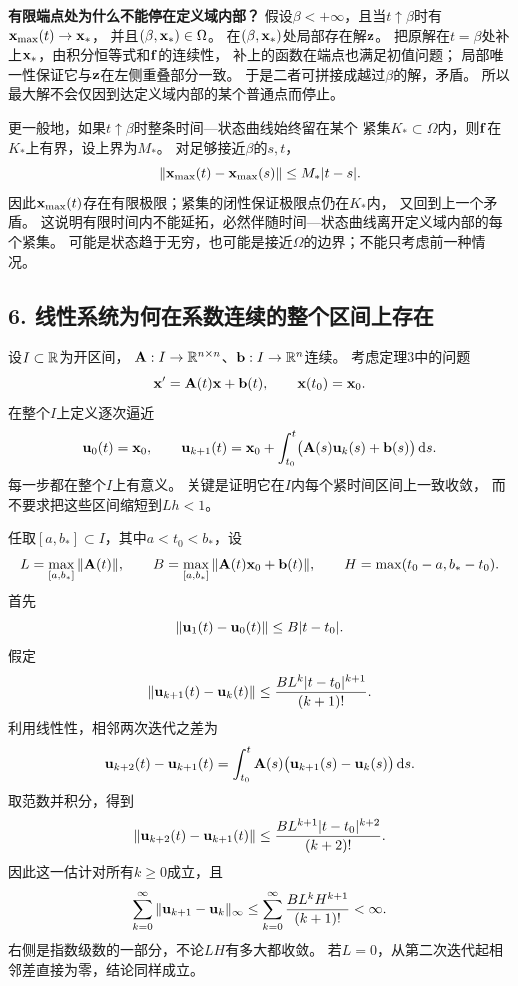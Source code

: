\textbf{有限端点处为什么不能停在定义域内部？}
假设$\beta<+\infty$，且当$t\uparrow\beta$时有$\vect{x}_{\max}(t)\to \vect{x}_*$，
并且$(\beta,\vect{x}_*)\in\Omega$。
在$(\beta,\vect{x}_*)$处局部存在解$\vect{z}$。
把原解在$t=\beta$处补上$\vect{x}_*$，由积分恒等式和$\vect{f}$的连续性，
补上的函数在端点也满足初值问题；
局部唯一性保证它与$\vect{z}$在左侧重叠部分一致。
于是二者可拼接成越过$\beta$的解，矛盾。
所以最大解不会仅因到达定义域内部的某个普通点而停止。

更一般地，如果$t\uparrow\beta$时整条时间—状态曲线始终留在某个
紧集$K_*\subset\Omega$内，则$\vect{f}$在$K_*$上有界，设上界为$M_*$。
对足够接近$\beta$的$s,t$，
\[
 \|\vect{x}_{\max}(t)-\vect{x}_{\max}(s)\|\le M_*|t-s|.
\]
因此$\vect{x}_{\max}(t)$存在有限极限；紧集的闭性保证极限点仍在$K_*$内，
又回到上一个矛盾。
这说明有限时间内不能延拓，必然伴随时间—状态曲线离开定义域内部的每个紧集。
可能是状态趋于无穷，也可能是接近$\Omega$的边界；不能只考虑前一种情况。

\subsection*{6. 线性系统为何在系数连续的整个区间上存在}

设$I\subset\mathbb R$为开区间，
$\mathbf{A}:I\to\mathbb R^{n\times n}$、$\vect{b}:I\to\R^n$连续。
考虑定理3中的问题
\[
 \vect{x}'=\mat{A}(t)\vect{x}+\vect{b}(t),\qquad \vect{x}(t_0)=\vect{x}_0.
\]
在整个$I$上定义逐次逼近
\[
 \vect{u}_0(t)=\vect{x}_0,\qquad
 \vect{u}_{k+1}(t)=\vect{x}_0+\int_{t_0}^t\bigl(\mat{A}(s)\vect{u}_k(s)+\vect{b}(s)\bigr)\,\dd s.
\]
每一步都在整个$I$上有意义。
关键是证明它在$I$内每个紧时间区间上一致收敛，
而不要求把这些区间缩短到$Lh<1$。

任取$[a,b_*]\subset I$，其中$a<t_0<b_*$，设
\[
 L=\max_{[a,b_*]}\|\mat{A}(t)\|,\qquad
 B=\max_{[a,b_*]}\|\mat{A}(t)\vect{x}_0+\vect{b}(t)\|,\qquad
 H=\max(t_0-a,b_*-t_0).
\]
首先
\[
 \|\vect{u}_1(t)-\vect{u}_0(t)\|\le B|t-t_0|.
\]
假定
\[
 \|\vect{u}_{k+1}(t)-\vect{u}_k(t)\|
 \le \frac{BL^k|t-t_0|^{k+1}}{(k+1)!}.
\]
利用线性性，相邻两次迭代之差为
\[
 \vect{u}_{k+2}(t)-\vect{u}_{k+1}(t)
 =\int_{t_0}^t \mat{A}(s)\bigl(\vect{u}_{k+1}(s)-\vect{u}_k(s)\bigr)\,\dd s.
\]
取范数并积分，得到
\[
 \|\vect{u}_{k+2}(t)-\vect{u}_{k+1}(t)\|
 \le \frac{BL^{k+1}|t-t_0|^{k+2}}{(k+2)!}.
\]
因此这一估计对所有$k\ge0$成立，且
\[
 \sum_{k=0}^\infty
 \|\vect{u}_{k+1}-\vect{u}_k\|_\infty
 \le
 \sum_{k=0}^\infty\frac{BL^kH^{k+1}}{(k+1)!}<\infty.
\]
右侧是指数级数的一部分，不论$LH$有多大都收敛。
若$L=0$，从第二次迭代起相邻差直接为零，结论同样成立。

